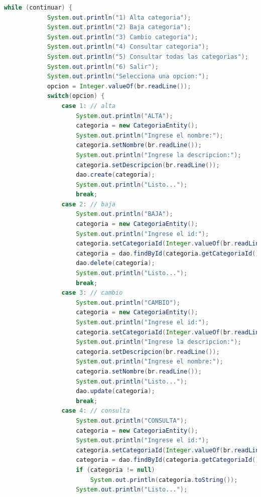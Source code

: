\documentclass[a4paper,12pt]{article}
\begin{document}
\begin{lstlisting}[language=Java, style=customJava, 
caption={Tiendita.java}, captionpos=b,basicstyle=\fontfamily{cmss}\small]
        while (continuar) {
            System.out.println("1) Alta categoria");
            System.out.println("2) Baja categoria");
            System.out.println("3) Cambio categoria");
            System.out.println("4) Consultar categoria");
            System.out.println("5) Consultar todas las categorias");
            System.out.println("6) Salir");
            System.out.println("Selecciona una opcion:");
            opcion = Integer.valueOf(br.readLine());
            switch(opcion) {
                case 1: // alta
                    System.out.println("ALTA");
                    categoria = new CategoriaEntity();
                    System.out.println("Ingrese el nombre:");
                    categoria.setNombre(br.readLine());
                    System.out.println("Ingrese la descripcion:");
                    categoria.setDescripcion(br.readLine());
                    dao.create(categoria);
                    System.out.println("Listo...");
                    break;
                case 2: // baja
                    System.out.println("BAJA");
                    categoria = new CategoriaEntity();
                    System.out.println("Ingrese el id:");
                    categoria.setCategoriaId(Integer.valueOf(br.readLine()));
                    categoria = dao.findById(categoria.getCategoriaId());
                    dao.delete(categoria);
                    System.out.println("Listo...");
                    break;
                case 3: // cambio
                    System.out.println("CAMBIO");
                    categoria = new CategoriaEntity();
                    System.out.println("Ingrese el id:");
                    categoria.setCategoriaId(Integer.valueOf(br.readLine()));
                    System.out.println("Ingrese la descripcion:");
                    categoria.setDescripcion(br.readLine());
                    System.out.println("Ingrese el nombre:");
                    categoria.setNombre(br.readLine());
                    System.out.println("Listo...");
                    dao.update(categoria);
                    break;
                case 4: // consulta
                    System.out.println("CONSULTA");
                    categoria = new CategoriaEntity();
                    System.out.println("Ingrese el id:");
                    categoria.setCategoriaId(Integer.valueOf(br.readLine()));
                    categoria = dao.findById(categoria.getCategoriaId());
                    if (categoria != null)
                        System.out.println(categoria.toString());
                    System.out.println("Listo...");

\end{lstlisting}
\end{document}

